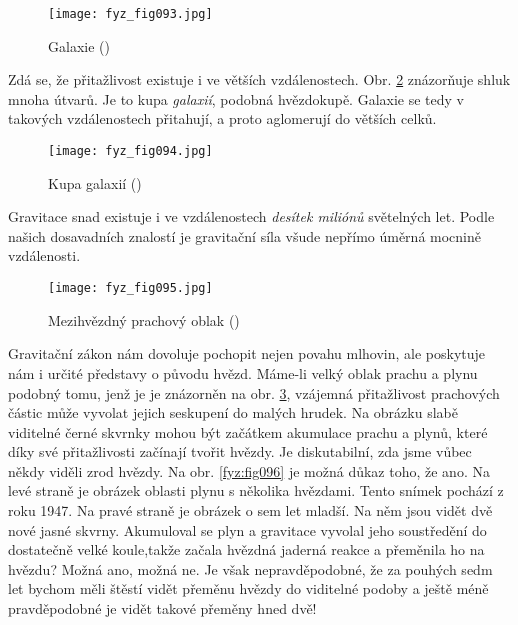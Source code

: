 {    \begin{figure}[ht!]  %
      \centering
      \texttt{[image: fyz\_fig093.jpg]}
      \caption{Galaxie (\cite[s.~99]{Feynman01})}
      \label{fyz:fig093}
    \end{figure}
    
    Zdá se, že přitažlivost existuje i ve větších vzdálenostech. Obr. \ref{fyz:fig094} znázorňuje 
    shluk mnoha  útvarů. Je to kupa \emph{galaxií}, podobná hvězdokupě. Galaxie se 
    tedy v takových vzdálenostech přitahují, a proto aglomerují do větších celků.

    \begin{figure}[ht!]  %
      \centering
      \texttt{[image: fyz\_fig094.jpg]}
      \caption{Kupa galaxií (\cite[s.~100]{Feynman01})}
      \label{fyz:fig094}
    \end{figure}
    
    Gravitace snad existuje i ve vzdálenostech \emph{desítek miliónů} světelných let. Podle našich 
    dosavadních znalostí je gravitační síla všude nepřímo úměrná mocnině vzdálenosti. 

    \begin{figure}[ht!]  %
      \centering
      \texttt{[image: fyz\_fig095.jpg]}
      \caption{Mezihvězdný prachový oblak (\cite[s.~101]{Feynman01})}
      \label{fyz:fig095}
    \end{figure}
    
    Gravitační zákon nám dovoluje pochopit nejen povahu mlhovin, ale poskytuje nám i určité 
    představy o původu hvězd. Máme-li velký oblak prachu a plynu podobný tomu, jenž je je znázorněn 
    na obr. \ref{fyz:fig095}, vzájemná přitažlivost prachových částic může vyvolat jejich seskupení 
    do malých hrudek. Na obrázku slabě viditelné  černé skvrnky mohou být začátkem 
    akumulace prachu a plynů, které díky své přitažlivosti začínají tvořit hvězdy. Je diskutabilní, 
    zda jsme vůbec někdy viděli zrod hvězdy. Na obr. \ref{fyz:fig096} je možná důkaz toho, že ano. 
    Na levé straně je obrázek oblasti plynu s několika hvězdami. Tento snímek pochází z roku 
    \num{1947}. Na pravé straně je obrázek o sem let mladší. Na něm jsou vidět dvě nové jasné 
    skvrny. Akumuloval se plyn a gravitace vyvolal jeho soustředění do dostatečně velké koule,takže 
    začala hvězdná jaderná reakce a přeměnila ho na hvězdu? Možná ano, možná ne. Je však 
    nepravděpodobné, že za pouhých sedm let bychom měli štěstí vidět přeměnu hvězdy do viditelné 
    podoby a ještě méně pravděpodobné je vidět takové přeměny hned dvě!

}
